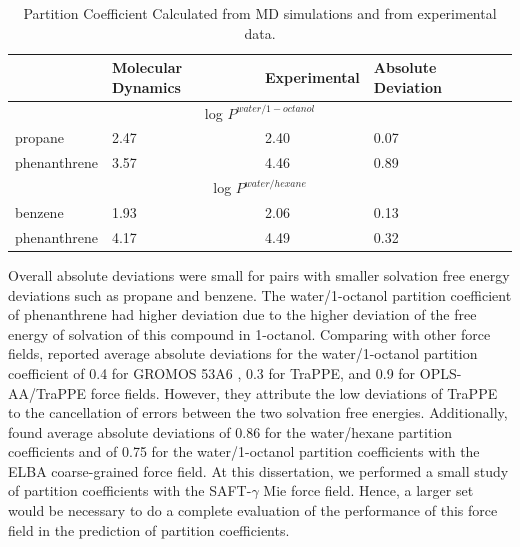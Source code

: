 \begin{table}[H]
    \centering
    \caption{Partition Coefficient Calculated from MD simulations and from experimental data.}
    \label{tbl:part}
    \begin{tabular}{llll}
    	\hline\hline
    	             & {Molecular Dynamics} & {Experimental} & Absolute Deviation \\ \hline
    	              \multicolumn{4}{c}{log $P^{water/1-octanol}$}               \\ \hline
    	propane      & 2.47                 & 2.40           & 0.07               \\
    	phenanthrene & 3.57                 & 4.46           & 0.89               \\ \hline
    	               \multicolumn{4}{c}{log $P^{water/hexane}$}                 \\ \hline
    	benzene      & 1.93                 & 2.06           & 0.13               \\
    	phenanthrene & 4.17                 & 4.49           & 0.32               \\
\hline\hline
    \end{tabular}
    
\end{table}

Overall absolute deviations were small for pairs with smaller solvation free energy deviations such as propane and benzene. The water/1-octanol partition coefficient of phenanthrene had higher deviation due to the higher deviation of the free energy of solvation of this compound in 1-octanol. Comparing with other force fields,  reported average absolute deviations for the water/1-octanol partition coefficient of 0.4 for GROMOS 53A6 \cite{JCC:JCC20090}, 0.3 for TraPPE, and 0.9 for OPLS-AA/TraPPE force fields. However, they attribute the low deviations of TraPPE to the cancellation of errors between the two solvation free energies. Additionally,  found average absolute deviations of 0.86 for the water/hexane partition coefficients and of 0.75 for the water/1-octanol partition coefficients with the ELBA coarse-grained force field. At this dissertation, we performed a small study of partition coefficients with the SAFT-$\gamma$ Mie force field. Hence, a larger set would be necessary to do a complete evaluation of the performance of this force field in the prediction of partition coefficients. 